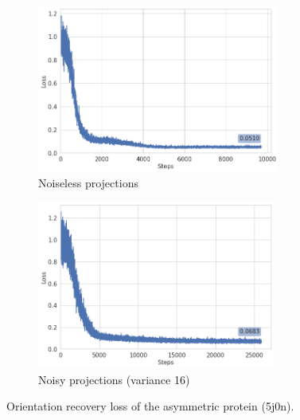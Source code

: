 \begin{figure}
    \centering
    \begin{subfigure}[b]{0.45\textwidth}
        \includegraphics[height=5.5cm]{images/5j0n_noise0_angle_recovery.png}
        \caption{Noiseless projections}
    \end{subfigure}
    \hfill
    \begin{subfigure}[b]{0.5\textwidth}
    \centering
        \includegraphics[height=5.5cm]{images/5j0n_noise16_angle_recovery.png}
        \caption{Noisy projections (variance 16)}
    \end{subfigure}
    \caption{ Orientation recovery loss of the asymmetric protein (5j0n).}
    \label{fig:orientation-recovery-loss}
\end{figure}

